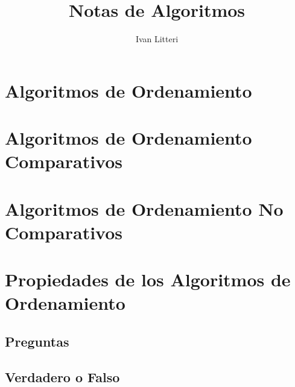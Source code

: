 \documentclass{article}
\title{Notas de Algoritmos}
\author{Ivan Litteri}
\date{}
\begin{document}
\maketitle
\lstset{language=Python}

% 

\section*{Algoritmos de Ordenamiento}


\section*{Algoritmos de Ordenamiento Comparativos}


\section*{Algoritmos de Ordenamiento No Comparativos}


\section*{Propiedades de los Algoritmos de Ordenamiento}


\subsection*{Preguntas}


\subsection*{Verdadero o Falso}

\end{document}
